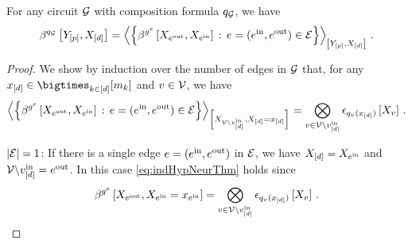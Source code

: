 \begin{theorem}
    \label{the:functionDecompositionRep}
    For any circuit $\mathcal{G}$ with composition formula $q_{\mathcal{G}}$, we have
    \begin{align*}
        \bencodingofat{\exfunctionof{\graph}}{\headvariables,\shortcatvariables}
        = \contractionof{\left\{\bencodingofat{\secexfunctionof{\edge}}{\catvariableof{\outgoingnodes},\catvariableof{\incomingnodes}} \wcols \edge=(\incomingnodes,\outgoingnodes)\in\edges\right\}
        }{\headvariables,\shortcatvariables} \, .
    \end{align*}
\end{theorem}
\begin{proof}
    We show by induction over the number of edges in $\mathcal{G}$ that, for any $\shortcatindicesin$ and $v\in\mathcal{V}$, we have
    \begin{align}
        \label{eq:indHypNeurThm}
        \contractionof{\left\{\bencodingofat{\secexfunctionof{\edge}}{\catvariableof{\outgoingnodes},\catvariableof{\incomingnodes}} \wcols \edge=(\incomingnodes,\outgoingnodes)\in\edges\right\}
        }{\catvariableof{\nodes\setexcept{\node^{\insymbol}_{[\atomorder]}}},\indexedshortcatvariables}
        = \bigotimes_{\node\in\nodes\setexcept{\node^{\insymbol}_{[\atomorder]}}} \onehotmapofat{\exfunctionof{\node}(\shortcatindices)}{\catvariableof{\node}} \, .
    \end{align}

    $\left|\mathcal{E}\right|=1$: If there is a single edge $e=(e^{\mathrm{in}},e^{\mathrm{out}})$ in $\mathcal{E}$, we have $X_{[d]}=X_{e^{\mathrm{in}}}$ and $\mathcal{V}\backslash v^{\mathrm{in}}_{[d]}=e^{\mathrm{out}}$.
    In this case \eqref{eq:indHypNeurThm} holds since
    \begin{align*}
        \bencodingofat{\secexfunctionof{\edge}}{\catvariableof{\outgoingnodes},\indexedcatvariableof{\incomingnodes}}
        = \bigotimes_{\node\in\nodes\setexcept{\node^{\insymbol}_{[\atomorder]}}} \onehotmapofat{\exfunctionof{\node}(\shortcatindices)}{\catvariableof{\node}} \, .
    \end{align*}


\end{proof}
